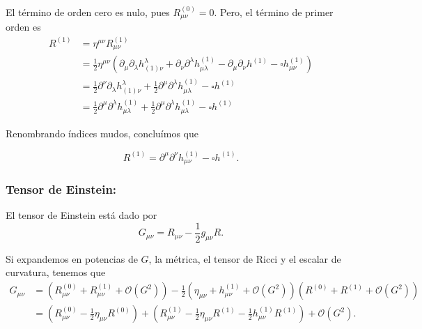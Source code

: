 \documentclass[letterpaper,11pt]{article}
\begin{document}
El término de orden cero es nulo, pues $R_{\mu\nu}^{(0)} = 0$. Pero, el término de primer orden es
\begin{align}
R^{(1)} &= \eta^{\mu\nu} R_{\mu\nu}^{(1)} \nonumber\\
&= \frac{1}{2} \eta^{\mu\nu} \left(\partial_{\mu} \partial_{\lambda} h_{(1)\nu}^{\lambda} + \partial_{\nu} \partial^{\lambda} h_{\mu\lambda}^{(1)}  -\partial_{\mu} \partial_{\nu} h^{(1)}  - \square h_{\mu\nu}^{(1)}  \right) \nonumber\\
&= \frac{1}{2} \partial^{\nu} \partial_{\lambda} h_{(1)\nu}^{\lambda} + \frac{1}{2} \partial^{\mu} \partial^{\lambda} h_{\mu\lambda}^{(1)} - \square h^{(1)} \nonumber  \\
&= \frac{1}{2} \partial^{\mu} \partial^{\lambda} h_{\mu\lambda}^{(1)} + \frac{1}{2} \partial^{\mu} \partial^{\lambda} h_{\mu\lambda}^{(1)} - \square h^{(1)}
\end{align}

Renombrando índices mudos, concluímos que
\begin{shaded}
\begin{equation}
R^{(1)} = \partial^{\mu}\partial^{\nu}  h_{\mu\nu}^{(1)} - \square h^{(1)}.
\end{equation}
\end{shaded}

\subsubsection*{Tensor de Einstein:}

El tensor de Einstein está dado por 
\begin{equation}
G_{\mu\nu} = R_{\mu\nu} - \frac{1}{2} g_{\mu\nu} R.
\end{equation}

Si expandemos en potencias de $G$, la métrica, el tensor de Ricci y el escalar de curvatura, tenemos que
\begin{align}
G_{\mu\nu} &= \left(R_{\mu\nu}^{(0)} + R_{\mu\nu}^{(1)} + \mathcal{O}(G^2) \right) - \frac{1}{2} \left( \eta_{\mu\nu} + h_{\mu\nu}^{(1)}  + \mathcal{O}(G^2) \right) \left(R^{(0)} + R^{(1)} + \mathcal{O}(G^2) \right) \nonumber \\
&= \left(R_{\mu\nu}^{(0)} - \frac{1}{2} \eta_{\mu\nu} R^{(0)} \right) + \left(R_{\mu\nu}^{(1)} - \frac{1}{2} \eta_{\mu\nu} R^{(1)} - \frac{1}{2} h_{\mu\nu}^{(1)} R^{(1)} \right) + \mathcal{O}(G^2).
\end{align}
\end{document}
